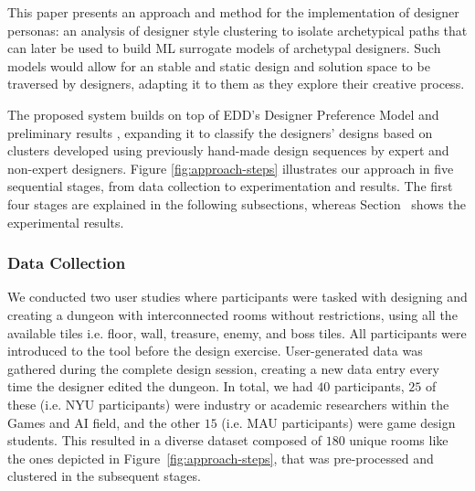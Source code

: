 

This paper presents an approach and method for the implementation of designer personas: an analysis of designer style clustering to isolate archetypical paths that can later be used to build ML surrogate models of archetypal designers. Such models would allow for an stable and static design and solution space to be traversed by designers, adapting it to them as they explore their creative process.


The proposed system builds on top of EDD's Designer Preference Model and preliminary results , expanding it to classify the designers' designs based on clusters developed using previously hand-made design sequences by expert and non-expert designers. Figure \ref{fig:approach-steps} illustrates our approach in five sequential stages, from data collection to experimentation and results. The first four stages are explained in the following subsections, whereas Section~ shows the experimental results.

\subsubsection{Data Collection}

We conducted two user studies where participants were tasked with designing and creating a dungeon with interconnected rooms without restrictions, using all the available tiles i.e. floor, wall, treasure, enemy, and boss tiles. All participants were introduced to the tool before the design exercise. User-generated data was gathered during the complete design session, creating a new data entry every time the designer edited the dungeon. In total, we had $40$ participants, $25$ of these (i.e. NYU participants) were industry or academic researchers within the Games and AI field, and the other $15$ (i.e. MAU participants) were game design students. This resulted in a diverse dataset composed of $180$ unique rooms like the ones depicted in Figure~\ref{fig:approach-steps}, that was pre-processed and clustered in the subsequent stages. 

